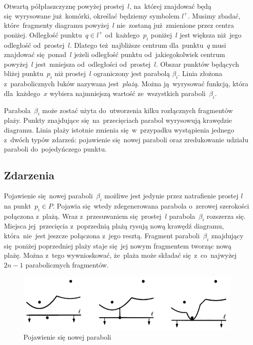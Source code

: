 \documentclass[skorowidz,autorrok,backref,xodstep,oswiadczenie]{wmimgr}
\begin{document}
Otwartą półpłaszczyznę powyżej prostej~$l$, na~której znajdować będą się~wyrysowane już~komórki, określać będziemy symbolem $l^{+}$. Musimy zbadać, które~fragmenty diagramu powyżej~$l$ nie~zostaną już~zmienione przez centra poniżej. Odległość punktu~$q \in l^{+}$ od~każdego~$p_{i}$ poniżej~$l$ jest większa niż~jego odległość od~prostej~$l$. Dlatego też~najbliższe centrum dla~punktu~$q$ musi znajdować się~ponad~$l$ jeżeli odległość punktu od~jakiegokolwiek centrum powyżej~$l$ jest~mniejsza od~odległości od~prostej~$l$. Obszar punktów będących bliżej punktu~$p_{i}$ niż prostej~$l$ ograniczony jest parabolą $\beta_{i}$. Linia złożona z~parabolicznych łuków nazywana jest~\emph{plażą}. Można ją~wyrysować funkcją, która dla~każdego~$x$ wybiera najmniejszą wartość ze~wszystkich paraboli~$\beta_{i}$.

Parabola~$\beta_{i}$ może zostać użyta do~utworzenia kilku rozłącznych fragmentów plaży. Punkty znajdujące się~na~przecięciach parabol wyrysowują krawędzie diagramu. Linia plaży istotnie zmienia się~w~przypadku wystąpienia jednego z~dwóch typów zdarzeń: pojawienie się~nowej paraboli oraz zredukowanie udziału paraboli do~pojedyńczego punktu.

\subsection{Zdarzenia}

Pojawienie się~nowej paraboli~$\beta_{i}$ możliwe jest jedynie przez natrafienie prostej $l$ na punkt~$p_{i} \in P$. Pojawia się~wtedy zdegenerowana parabola o~zerowej szerokości połączona z~plażą. Wraz z~przesuwaniem się~prostej~$l$ parabola~$\beta_{i}$ rozszerza się. Miejsca jej~przecięcia z~poprzednią plażą rysują nową krawędź diagramu, która~nie~jest jeszcze połączona z~jego resztą. Fragment paraboli~$\beta_{i}$ znajdujący się~poniżej poprzedniej plaży staje się~jej nowym fragmentem tworząc nową plażę. Można z~tego wywnioskować, że~plaża może składać się~z~co~najwyżej~$2n-1$ parabolicznych fragmentów.

\begin{figure}[ht!]
\centering
\includegraphics[width=150mm]{images/voronoi4.png}
\caption{Pojawienie się nowej paraboli}
\label{voronoinewarc}
\end{figure}
\end{document}
